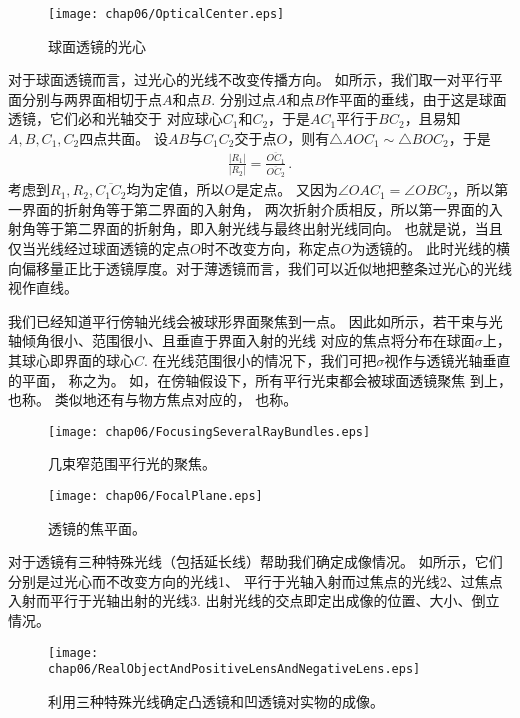 \begin{figure}[htbp]
    \centering\texttt{[image: chap06/OpticalCenter.eps]}
    \caption{球面透镜的光心}
    \label{fig:6.35}
\end{figure}

对于球面透镜而言，过光心的光线不改变传播方向。
如所示，我们取一对平行平面分别与两界面相切于点$A$和点$B$.
分别过点$A$和点$B$作平面的垂线，由于这是球面透镜，它们必和光轴交于
对应球心$C_1$和$C_2$，于是$AC_1$平行于$BC_2$，且易知$A, B, C_1, C_2$四点共面。
设$AB$与$C_1C_2$交于点$O$，则有$\triangle AOC_1\sim\triangle BOC_2$，于是
\begin{align}
    \frac{|R_1|}{|R_2|}=\frac{\overline{OC_1}}{\overline{OC_2}}\, .
\end{align}
考虑到$R_1, R_2, \overline{C_1C_2}$均为定值，所以$O$是定点。
又因为$\angle OAC_1=\angle OBC_2$，所以第一界面的折射角等于第二界面的入射角，
两次折射介质相反，所以第一界面的入射角等于第二界面的折射角，即入射光线与最终出射光线同向。
也就是说，当且仅当光线经过球面透镜的定点$O$时不改变方向，称定点$O$为透镜的。
此时光线的横向偏移量正比于透镜厚度。对于薄透镜而言，我们可以近似地把整条过光心的光线视作直线。

我们已经知道平行傍轴光线会被球形界面聚焦到一点。
因此如所示，若干束与光轴倾角很小、范围很小、且垂直于界面入射的光线
对应的焦点将分布在球面$\sigma$上，其球心即界面的球心$C$.
在光线范围很小的情况下，我们可把$\sigma$视作与透镜光轴垂直的平面，
称之为。
如，在傍轴假设下，所有平行光束都会被球面透镜聚焦
到上，
也称。
类似地还有与物方焦点对应的，
也称。
\begin{figure}[htbp]
    \centering\texttt{[image: chap06/FocusingSeveralRayBundles.eps]}
    \caption{几束窄范围平行光的聚焦。}
    \label{fig:6.36}
\end{figure}
\begin{figure}[htbp]
    \centering\texttt{[image: chap06/FocalPlane.eps]}
    \caption{透镜的焦平面。}
    \label{fig:6.37}
\end{figure}

对于透镜有三种特殊光线（包括延长线）帮助我们确定成像情况。
如所示，它们分别是过光心而不改变方向的光线1、
平行于光轴入射而过焦点的光线2、过焦点入射而平行于光轴出射的光线3.
出射光线的交点即定出成像的位置、大小、倒立情况。
\begin{figure}[htbp]
    \centering\texttt{[image: chap06/RealObjectAndPositiveLensAndNegativeLens.eps]}
    \caption{利用三种特殊光线确定凸透镜和凹透镜对实物的成像。}
    \label{fig:6.38}
\end{figure}

